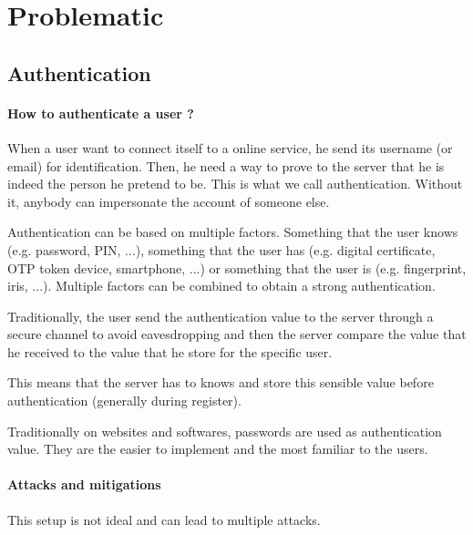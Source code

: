 \documentclass[../report.tex]{subfiles}
\begin{document}




\section{Problematic}
\subsection{Authentication}

\paragraph{How to authenticate a user ?}

When a user want to connect itself to a online service, he send its username (or email) for identification. Then, he need a way to prove to the server that he is indeed the person he pretend to be. This is what we call authentication. Without it, anybody can impersonate the account of someone else.

Authentication can be based on multiple factors. Something that the user knows (e.g. password, PIN, ...), something that the user has (e.g. digital certificate, OTP token device, smartphone, ...) or something that the user is (e.g. fingerprint, iris, ...). Multiple factors can be combined to obtain a strong authentication.

Traditionally, the user send the authentication value to the server through a secure channel to avoid eavesdropping and then the server compare the value that he received to the value that he store for the specific user.

This means that the server has to knows and store this sensible value before authentication (generally during register).

Traditionally on websites and softwares, passwords are used as authentication value. They are the easier to implement and the most familiar to the users.



\paragraph{Attacks and mitigations}
This setup is not ideal and can lead to multiple attacks.
\end{document}
